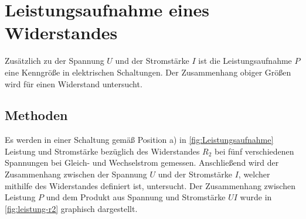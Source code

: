 



\section{Leistungsaufnahme eines Widerstandes}

Zusätzlich zu der Spannung $U$ und der Stromstärke $I$ ist die Leistungsaufnahme $P$ eine Kenngröße in elektrischen Schaltungen. Der Zusammenhang obiger Größen wird für einen Widerstand untersucht.



\subsection{Methoden}
Es werden in einer Schaltung gemäß Position a) in \cref{fig:Leistungsaufnahme} Leistung und Stromstärke bezüglich des Widerstandes $R_2$ bei fünf verschiedenen Spannungen bei Gleich- und Wechselstrom gemessen.
Anschließend wird der Zusammenhang zwischen der Spannung $U$ und der Stromstärke $I$, welcher mithilfe des Widerstandes definiert ist, untersucht.
Der Zusammenhang zwischen Leistung $P$ und dem Produkt aus Spannung und Stromstärke $UI$ wurde in \cref{fig:leistung-r2} graphisch dargestellt.








































